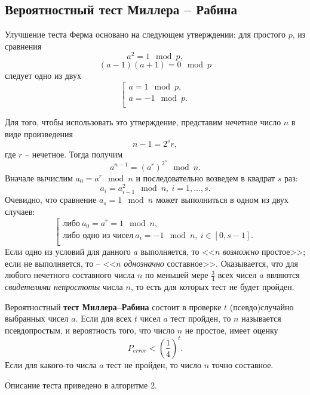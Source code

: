 \subsection{Вероятностный тест Миллера -- Рабина}

Улучшение теста Ферма основано на следующем утверждении: для простого $p$, из сравнения
    \[ a^2 = 1 \mod p, \]
    \[ (a-1)(a+1) = 0 \mod p \]
следует одно из двух
\[ \left[ \begin{array}{l}
     a = 1 \mod p, \\
     a = -1 \mod p. \\
\end{array} \right. \]

Для того, чтобы использовать это утверждение, представим нечетное число $n$  в виде произведения
    \[ n-1 = 2^s r, \]
где $r$ -- нечетное. Тогда получим
    \[ a^{n-1} = (a^r)^{2^s} \mod n. \]
Вначале вычислим $a_0 = a^r \mod n$ и последовательно возведем в квадрат $s$ раз:
    \[ a_i = a_{i-1}^2 \mod n, ~ i = 1, \dots, s. \]
Очевидно, что сравнение $a_s = 1 \mod n$ может выполниться в одном из двух случаев:
\[ \left[ \begin{array}{l}
    \text{либо}~ a_0 = a^r = 1 \mod n, \\
    \text{либо одно из чисел}~ a_i = -1 \mod n, ~ i \in [0, s-1]. \\
\end{array} \right. \]
Если одно из условий для данного $a$  выполняется, то  <<$n$ \emph{возможно} простое>>; если не выполняется, то -- <<$n$ \emph{однозначно} составное>>. Оказывается, что для любого нечетного составного числа $n$ по меньшей мере $\frac{3}{4}$ всех чисел $a$ являются \emph{свидетелями непростоты} числа $n$, то есть для которых тест не будет пройден.

Вероятностный \textbf{тест Миллера--Рабина} состоит в проверке $t$ (псевдо)случайно выбранных чисел $a$. Если для всех $t$ чисел $a$ тест пройден, то $n$ называется псевдопростым, и вероятность того, что число $n$ не простое, имеет оценку
    \[ P_{error} < \left( \frac{1}{4} \right)^t. \]
Если для какого-то числа $a$ тест не пройден, то число $n$ точно составное.

Описание теста приведено в алгоритме $2$.


